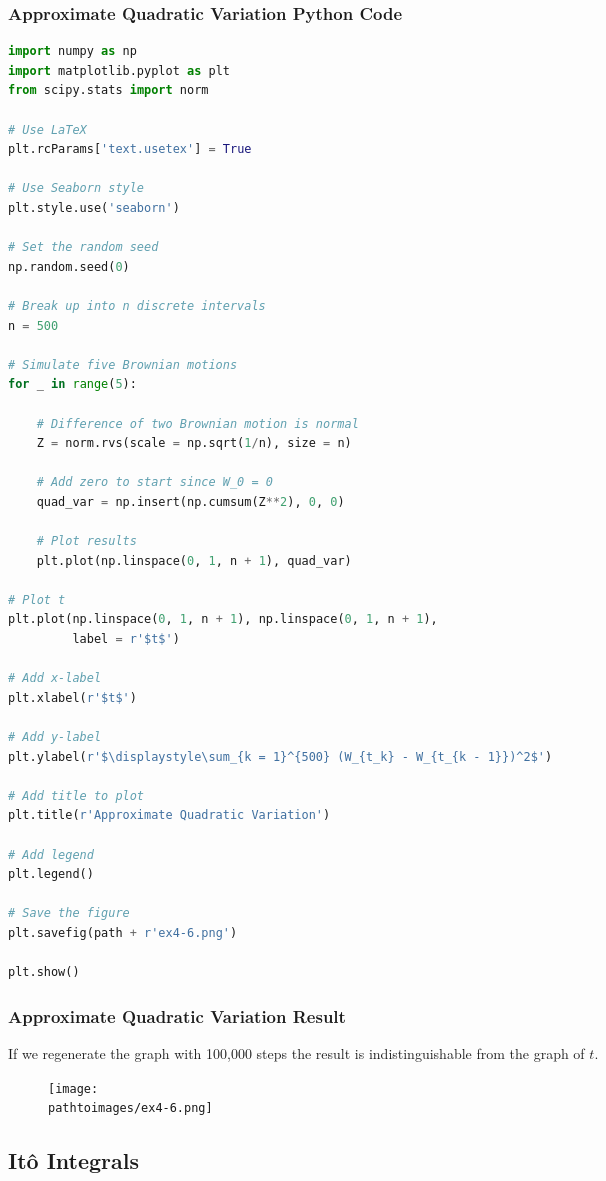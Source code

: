 \documentclass{beamer}
\newcommand{\pathtoimages}{/Users/charlesrambo/Desktop/Bootcamp24/Images}
\begin{document}
\begin{frame}[fragile]
\frametitle{Approximate Quadratic Variation Python Code}

\begin{multicols}{2}
\begin{lstlisting}[language=Python]
import numpy as np
import matplotlib.pyplot as plt
from scipy.stats import norm

# Use LaTeX
plt.rcParams['text.usetex'] = True

# Use Seaborn style
plt.style.use('seaborn')

# Set the random seed
np.random.seed(0)

# Break up into n discrete intervals
n = 500

# Simulate five Brownian motions
for _ in range(5):
    
    # Difference of two Brownian motion is normal
    Z = norm.rvs(scale = np.sqrt(1/n), size = n)
    
    # Add zero to start since W_0 = 0
    quad_var = np.insert(np.cumsum(Z**2), 0, 0)
    
    # Plot results
    plt.plot(np.linspace(0, 1, n + 1), quad_var)

# Plot t
plt.plot(np.linspace(0, 1, n + 1), np.linspace(0, 1, n + 1), 
         label = r'$t$')
    
# Add x-label
plt.xlabel(r'$t$')

# Add y-label
plt.ylabel(r'$\displaystyle\sum_{k = 1}^{500} (W_{t_k} - W_{t_{k - 1}})^2$')

# Add title to plot
plt.title(r'Approximate Quadratic Variation')

# Add legend
plt.legend()

# Save the figure
plt.savefig(path + r'ex4-6.png')

plt.show()
\end{lstlisting}
\end{multicols}
\end{frame}

\begin{frame}[fragile]
\frametitle{Approximate Quadratic Variation Result}
If we regenerate the graph with 100,000 steps the result is indistinguishable from the graph of $t$.
\begin{figure}
\centering
\texttt{[image: \\pathtoimages/ex4-6.png]}
\end{figure}
\end{frame}



\subsection{It\^o Integrals}
\end{document}

